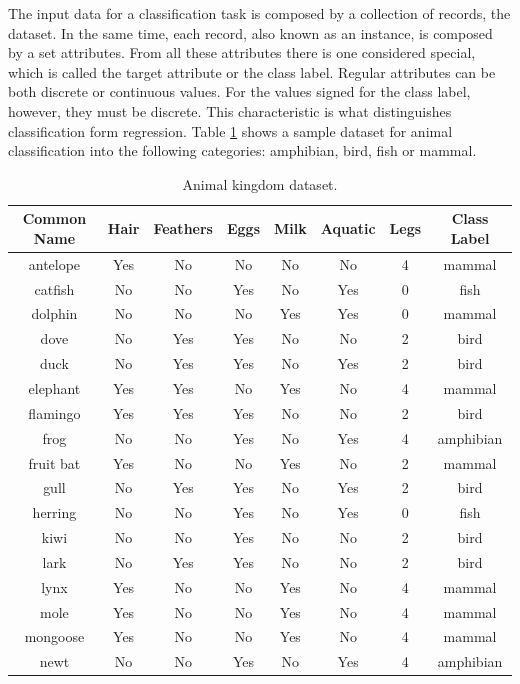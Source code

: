 \FloatBarrier

The input data for a classification task is composed by a collection of records, the dataset. In the same time, each record, also known as an instance, is composed by a set attributes. From all these attributes there is one considered special, which is called the target attribute or the class label. Regular attributes can be both discrete or continuous values. For the values signed for the class label, however, they must be discrete. This characteristic is what distinguishes classification form regression. Table \ref{tab:clasiffication_table} shows a sample dataset for animal classification into the following categories: amphibian, bird, fish or mammal.

\begin{table}[!htp]
\centering
\begin{tabular}{ |c|c|c|c|c|c|c|c| }
\hline
Common Name & Hair & Feathers & Eggs & Milk & Aquatic & Legs & Class Label \\ \hline
antelope & Yes & No & No & No & No & 4 & mammal \\ \hline
catfish & No & No & Yes & No & Yes & 0 & fish \\ \hline
dolphin & No & No & No & Yes & Yes & 0 & mammal \\ \hline
dove & No & Yes & Yes & No & No & 2 & bird \\ \hline
duck & No & Yes & Yes & No & Yes & 2 & bird \\ \hline
elephant & Yes & Yes & No & Yes & No & 4 & mammal \\ \hline
flamingo & Yes & Yes & Yes & No & No & 2 & bird \\ \hline
frog & No & No & Yes & No & Yes & 4 & amphibian \\ \hline
fruit bat & Yes & No & No & Yes & No & 2 & mammal \\ \hline
gull & No & Yes & Yes & No & Yes & 2 & bird \\ \hline
herring & No & No & Yes & No & Yes & 0 & fish \\ \hline
kiwi & No & No & Yes & No & No & 2 & bird \\ \hline
lark & No & Yes & Yes & No & No & 2 & bird \\ \hline
lynx & Yes & No & No & Yes & No & 4 & mammal \\ \hline
mole & Yes & No & No & Yes & No & 4 & mammal \\ \hline
mongoose & Yes & No & No & Yes & No & 4 & mammal \\ \hline
newt & No & No & Yes & No & Yes & 4 & amphibian \\
\hline
\end{tabular}
\caption{Animal kingdom dataset.}
\label{tab:clasiffication_table}
\end{table}

